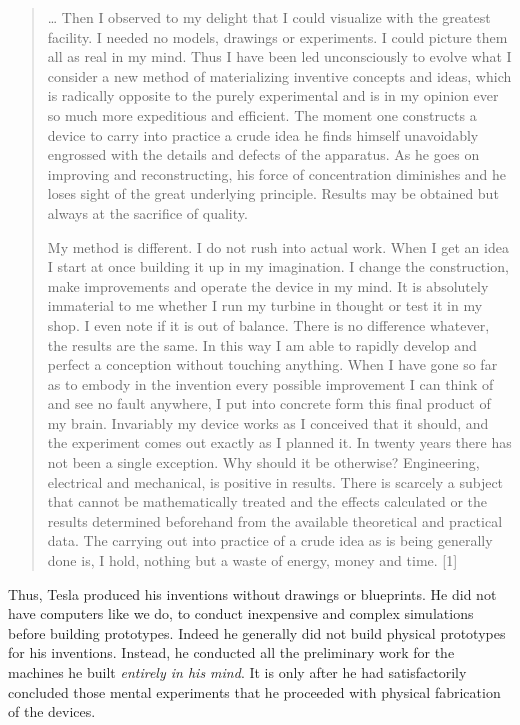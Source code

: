 \documentclass[
  12pt,
  british,
  a4paper,
]{article}
\begin{document}
\begin{quote}
\ldots{} Then I observed to my delight that I could visualize with the
greatest facility. I needed no models, drawings or experiments. I could
picture them all as real in my mind. Thus I have been led unconsciously
to evolve what I consider a new method of materializing inventive
concepts and ideas, which is radically opposite to the purely
experimental and is in my opinion ever so much more expeditious and
efficient. The moment one constructs a device to carry into practice a
crude idea he finds himself unavoidably engrossed with the details and
defects of the apparatus. As he goes on improving and reconstructing,
his force of concentration diminishes and he loses sight of the great
underlying principle. Results may be obtained but always at the
sacrifice of quality.

My method is different. I do not rush into actual work. When I get an
idea I start at once building it up in my imagination. I change the
construction, make improvements and operate the device in my mind. It is
absolutely immaterial to me whether I run my turbine in thought or test
it in my shop. I even note if it is out of balance. There is no
difference whatever, the results are the same. In this way I am able to
rapidly develop and perfect a conception without touching anything. When
I have gone so far as to embody in the invention every possible
improvement I can think of and see no fault anywhere, I put into
concrete form this final product of my brain. Invariably my device works
as I conceived that it should, and the experiment comes out exactly as I
planned it. In twenty years there has not been a single exception. Why
should it be otherwise? Engineering, electrical and mechanical, is
positive in results. There is scarcely a subject that cannot be
mathematically treated and the effects calculated or the results
determined beforehand from the available theoretical and practical data.
The carrying out into practice of a crude idea as is being generally
done is, I hold, nothing but a waste of energy, money and time. {[}1{]}
\end{quote}

Thus, Tesla produced his inventions without drawings or blueprints. He
did not have computers like we do, to conduct inexpensive and complex
simulations before building prototypes. Indeed he generally did not
build physical prototypes for his inventions. Instead, he conducted all
the preliminary work for the machines he built \emph{entirely in his
mind}. It is only after he had satisfactorily concluded those mental
experiments that he proceeded with physical fabrication of the devices.
\end{document}
